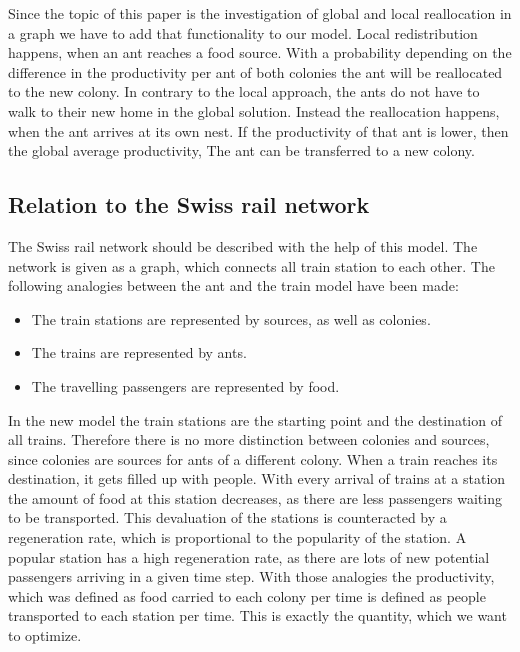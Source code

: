 Since the topic of this paper is the investigation of global and local reallocation in a graph we have to add that functionality to our model. Local redistribution happens, when an ant reaches a food source. With a probability depending on the difference in the productivity per ant of both colonies the ant will be reallocated to the new colony. In contrary to the local approach, the ants do not have to walk to their new home in the global solution. Instead the reallocation happens, when the ant arrives at its own nest. If the productivity of that ant is lower, then the global average productivity, The ant can be transferred to a new colony.
\subsection{Relation to the Swiss rail network}\label{relationNetwork}
The Swiss rail network should be described with the help of this model. The network is given as a graph, which connects all train station to each other. The following analogies between the ant and the train model have been made:
\begin{itemize}
  \item The train stations are represented by sources, as well as colonies.
  \item The trains are represented by ants.
  \item The travelling passengers are represented by food.
\end{itemize}
 In the new model the train stations are the starting point and the destination of all trains. Therefore there is no more distinction between colonies and sources, since colonies are sources for ants of a different colony. When a train reaches its destination, it gets filled up with people. With every arrival of trains at a station the amount of food at this station decreases, as there are less passengers waiting to be transported. This devaluation of the stations is counteracted by a regeneration rate, which is proportional to the popularity of the station. A popular station has a high regeneration rate, as there are lots of new potential passengers arriving in a given time step. With those analogies the productivity, which was defined as food carried to each colony per time is defined as people transported to each station per time. This is exactly the quantity, which we want to optimize.